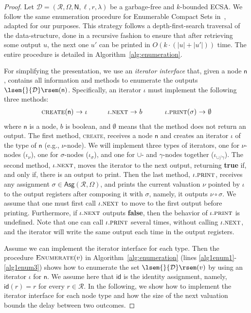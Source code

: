 \documentclass[
a4paper
]{article}
\theoremstyle{plain}
\theoremstyle{definition}
\theoremstyle{remark}
\newcommand{\Reg}{\mathcal{R}}
\newcommand{\Asg}{\operatorname{Asg}}
\newcommand{\D}{\mathcal{D}}
\newcommand{\n}{\textsf{n}}
\newcommand{\N}{\textsf{N}}
\newcommand{\uit}{\iota}
\newcommand{\uid}{\operatorname{id}}
\newcommand{\sem}[1]{{\lsem{}{#1}\rsem}}
\renewcommand{\operatorname}[1]{\textsf{#1}}
\begin{document}
\begin{proof}	
	Let $\D = (\Reg, \Omega, \N, \ell, r, \lambda)$ be a garbage-free and $k$-bounded ECSA.
	We follow the same enumeration procedure for Enumerable Compact Sets in~\cite{MunozR22,MunozR23}, adapted for our purposes.
	This strategy follows a depth-first-search traversal of the data-structure, done in a recursive fashion to ensure that after retrieving some output $u$, the next one $u'$ can be printed in $O(k\cdot (|u| + |u'|))$ time. The entire procedure is detailed in Algorithm~\ref{alg:enumeration}.
	
	
	
	For simplifying the presentation, we use an \emph{iterator interface} that, given a node $\n$, contains all information and methods to enumerate the outputs $\sem{\D}(\n)$. Specifically, an iterator $\uit$ must implement the following three methods:
	\[
	\begin{array}{rclrclrcl}
		\textsc{create}(\n) & \!\!\!\!\rightarrow\!\!\!\! & \uit   \ \ \ \ \ \	 & \uit.\textsc{next} & \!\!\!\! \rightarrow \!\!\!\! & b  \ \ \ \ \ \ \ &  \uit.\textsc{print}(\sigma)  & \!\!\!\!\rightarrow\!\!\!\! & \emptyset
	\end{array}
	\]
	where $\n$ is a node, $b$ is boolean, and $\emptyset$ means that the method does not return an output. 
	The first method, \textsc{create}, receives a node $\n$ and creates an iterator $\uit$ of the type of $\n$ (e.g., $\nu$-node). We will implement three types of iterators, one for $\nu$-nodes ($\uit_\nu$), one for $\sigma$-nodes ($\uit_\sigma$), and one for $\cup$- and $\gamma$-nodes together ($\uit_{\cup/\gamma}$). The second method, $\uit.\textsc{next}$, moves the iterator to the next output, returning {\bf true} if, and only if, there is an output to print. Then the last method, $\uit.\textsc{print}$, receives any assignment $\sigma \in \Asg(\Reg, \Omega)$, and prints the current valuation $\nu$ pointed by $\uit$ to the output registers after composing it with $\sigma$, namely, it outputs $\nu \circ \sigma$. 
	We assume that one must first call $\uit.\textsc{next}$ to move to the first output before printing. Furthermore, if $\uit.\textsc{next}$ outputs {\bf false}, then the behavior of $\uit.\textsc{print}$ is undefined. Note that one can call $\uit.\textsc{print}$ several times, without calling $\uit.\textsc{next}$, and the iterator will write the same output each time in the output registers. 
	
	Assume we can implement the iterator interface for each type. Then the procedure $\textsc{Enumerate}(v)$ in Algorithm~\ref{alg:enumeration} (lines \ref{alg1enum1}-\ref{alg1enum3}) shows how to enumerate the set $\sem{\D}(v)$ by using an iterator $\uit$ for $\n$. We assume here that $\uid$ is the identity assignment, namely, $\uid(r) = r$ for every $r \in \Reg$.  In the following, we show how to implement the iterator interface for each node type and how the size of the next valuation bounds the delay between two outcomes.
	

\end{proof}
\end{document}
